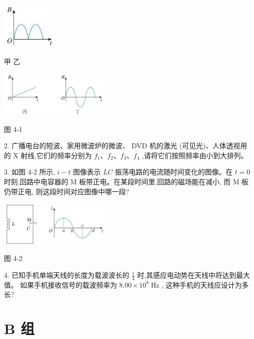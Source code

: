 \documentclass[10pt]{article}
\begin{document}
\begin{center}
\includegraphics[max width=0.2\textwidth]{images/01910e72-c5b7-7ed5-a6d4-fb3a5faefc32_93_846125.jpg}
\end{center}

甲 乙

\begin{center}
\includegraphics[max width=0.4\textwidth]{images/01910e72-c5b7-7ed5-a6d4-fb3a5faefc32_93_437131.jpg}
\end{center}

图 4-1

2. 广播电台的短波、家用微波炉的微波、 DVD 机的激光 (可见光)、人体透视用的 \(\mathrm{X}\) 射线,它们的频率分别为 \({f}_{1}\text{、}{f}_{2}\text{、}{f}_{3}\text{、}{f}_{4}\) ,请将它们按照频率由小到大排列。

3. 如图 4-2 所示, \(i - t\) 图像表示 \({LC}\) 振荡电路的电流随时间变化的图像。在 \(t = 0\) 时刻,回路中电容器的 \(\mathrm{M}\) 板带正电。在某段时间里,回路的磁场能在减小, 而 M 板仍带正电, 则这段时间对应图像中哪一段?

\begin{center}
\includegraphics[max width=0.4\textwidth]{images/01910e72-c5b7-7ed5-a6d4-fb3a5faefc32_93_957480.jpg}
\end{center}

图 4-2

4. 已知手机单端天线的长度为载波波长的 \(\frac{1}{4}\) 时,其感应电动势在天线中将达到最大值。 如果手机接收信号的载波频率为 \({8.00} \times {10}^{8}\mathrm{\;{Hz}}\) , 这种手机的天线应设计为多长?

\section*{B 组}
\end{document}
